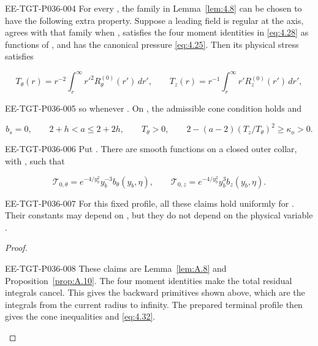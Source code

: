 \begin{lemma}\label{lem:4.9}
\begin{EESegment}{EE-TGT-P036-004}
For every , the family in
Lemma~\ref{lem:4.8} can be chosen to have the following extra property.
Suppose a leading field is regular at the axis, agrees with that family when
, satisfies the four moment
identities in \eqref{eq:4.28} as functions of
, and has the canonical pressure \eqref{eq:4.25}.
Then its physical stress 
satisfies
\end{EESegment}
\[
  T_\theta(r)=r^{-2}\int_r^\infty r'^2R_\theta^{(0)}(r')\,dr',
  \qquad
  T_z(r)=r^{-1}\int_r^\infty r'R_z^{(0)}(r')\,dr',
\]
\begin{EESegment}{EE-TGT-P036-005}
so  whenever
. On
, the admissible cone
condition holds and
\end{EESegment}
\[
  b_s=0,\qquad 2+h<a\leq2+2h,\qquad T_\theta>0,
  \qquad 2-(a-2)(T_z/T_\theta)^2\geq\kappa_o>0.
\]
\begin{EESegment}{EE-TGT-P036-006}
Put . There are smooth functions
 on a closed outer collar, with
, such that
\end{EESegment}
\begin{equation}
  \mathcal{T}_{0,\theta}=e^{-4/y_b^2}y_b^{-3}b_\theta(y_b,\eta),
  \qquad
  \mathcal{T}_{0,z}=e^{-4/y_b^2}y_b^3b_z(y_b,\eta).
  \tag{4.32}\label{eq:4.32}
\end{equation}
\begin{EESegment}{EE-TGT-P036-007}
For this fixed profile, all these claims hold uniformly for
. Their constants may depend on
, but they do not depend on the physical variable
.
\end{EESegment}
\end{lemma}

\begin{proof}
\begin{EESegment}{EE-TGT-P036-008}
These claims are Lemma~\ref{lem:A.8} and
Proposition~\ref{prop:A.10}. The four moment identities make the total
residual integrals cancel. This gives the backward primitives shown above,
which are the integrals from the current radius to infinity. The prepared
terminal profile then gives the cone inequalities and
\eqref{eq:4.32}.
\end{EESegment}
\end{proof}

